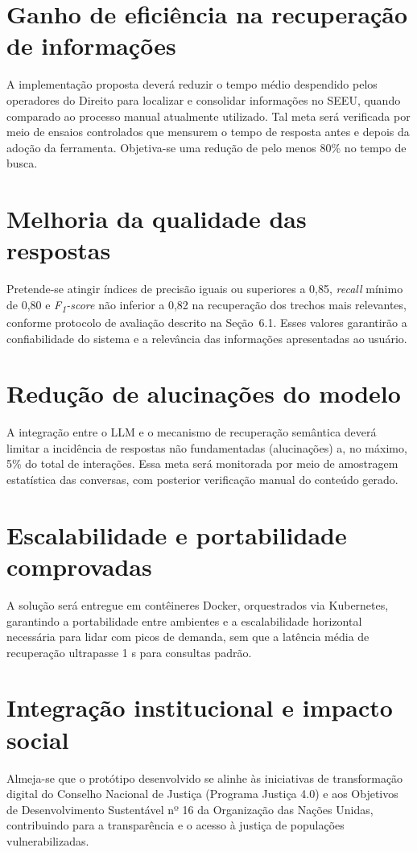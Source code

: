 \begin{description}
\section{Ganho de eficiência na recuperação de informações}
A implementação proposta deverá reduzir o tempo médio despendido pelos operadores do Direito para localizar e consolidar informações no SEEU, quando comparado ao processo manual atualmente utilizado. Tal meta será verificada por meio de ensaios controlados que mensurem o tempo de resposta antes e depois da adoção da ferramenta. Objetiva-se uma redução de pelo menos 80\% no tempo de busca.

\section{Melhoria da qualidade das respostas}
Pretende-se atingir índices de precisão iguais ou superiores a 0,85, \emph{recall} mínimo de 0,80 e \emph{F\textsubscript{1}-score} não inferior a 0,82 na recuperação dos trechos mais relevantes, conforme protocolo de avaliação descrito na Seção~6.1. Esses valores garantirão a confiabilidade do sistema e a relevância das informações apresentadas ao usuário.

\section{Redução de alucinações do modelo}
A integração entre o LLM e o mecanismo de recuperação semântica deverá limitar a incidência de respostas não fundamentadas (alucinações) a, no máximo, 5\% do total de interações. Essa meta será monitorada por meio de amostragem estatística das conversas, com posterior verificação manual do conteúdo gerado.

\section{Escalabilidade e portabilidade comprovadas}
A solução será entregue em contêineres Docker, orquestrados via Kubernetes, garantindo a portabilidade entre ambientes e a escalabilidade horizontal necessária para lidar com picos de demanda, sem que a latência média de recuperação ultrapasse 1 s para consultas padrão.

\section{Integração institucional e impacto social}
Almeja-se que o protótipo desenvolvido se alinhe às iniciativas de transformação digital do Conselho Nacional de Justiça (Programa Justiça 4.0) e aos Objetivos de Desenvolvimento Sustentável nº 16 da Organização das Nações Unidas, contribuindo para a transparência e o acesso à justiça de populações vulnerabilizadas.


\end{description}

